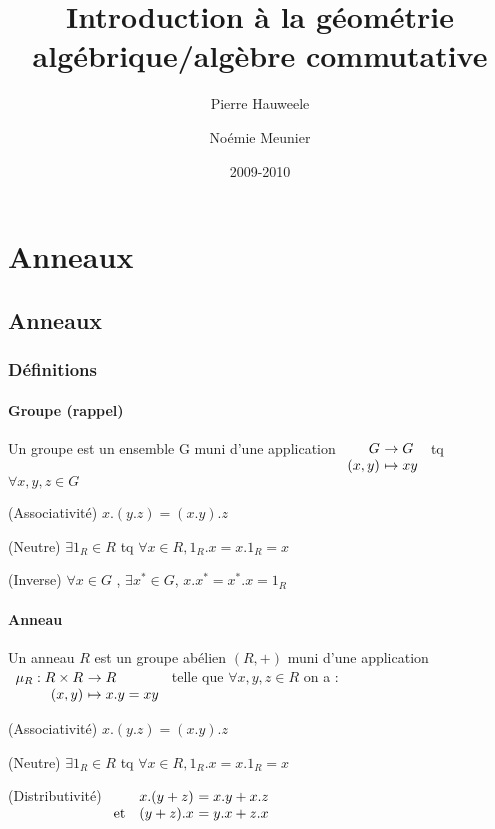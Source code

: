 \documentclass[reqno,a4paper,10pt]{report}
\author{Pierre Hauweele \and Noémie Meunier}
\title{Introduction à la géométrie algébrique/algèbre commutative}
\date{2009-2010}
\makeatletter
\let\oldenumerate=\enumerate%
\renewenvironment{enumerate}{%
    \oldenumerate%
  }{%
    \@noparlisttrue%
    \endlist%
  }%
\makeatother
\begin{document}
\maketitle
\tableofcontents
\chapter{Anneaux}
\section{Anneaux}
\subsection{Définitions}
\subsubsection{Groupe (rappel)} 
Un groupe est un ensemble G muni d'une application
$\begin{array}[t]{r@{\ }l}
  G &\to G\\
  (x,y) &\mapsto xy
\end{array}$
tq $\forall x,y,z \in G$
\begin{enumerate}[(1)]
  \item (Associativité) $x.(y.z)=(x.y).z$
  \item (Neutre) $\exists 1_R \in R$ tq $\forall x \in R, 1_R.x = x.1_R = x$
  \item (Inverse) $\forall x \in G$ , $\exists x^*\in G$, $x.x^* = x^*.x = 1_R$
\end{enumerate}

\subsubsection{Anneau}
Un anneau $R$ est un groupe abélien $(R, +)$ muni d'une application
$\begin{array}[t]{r@{\ }l}
  \mu_R: R \times R &\to R\\
  (x,y) &\mapsto x.y = xy
\end{array}$
telle que $\forall x,y,z \in R$ on a :
\begin{enumerate}[(1)]
  \item (Associativité) $x.(y.z)=(x.y).z$
  \item (Neutre) $\exists 1_R \in R$ tq $\forall x \in R, 1_R.x = x.1_R = x$
  \item (Distributivité) 
    $\begin{array}[t]{r@{\ }l}
      x.(y+z) &= x.y + x.z\\
      \text{et }~ ~ (y+z).x &= y.x + z.x
    \end{array}$
\end{enumerate}
\end{document}
